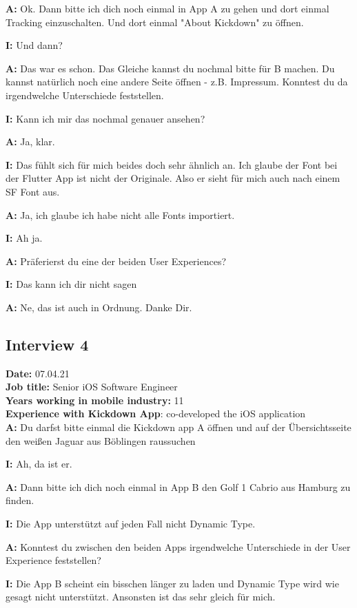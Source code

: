 \begin{myparindent}{0pt}
\textbf{A:} Ok. Dann bitte ich dich noch einmal in App A zu gehen und dort einmal Tracking einzuschalten. Und dort einmal "About Kickdown" zu öffnen. 

\textbf{I:} Und dann?

\textbf{A:} Das war es schon. Das Gleiche kannst du nochmal bitte für B machen. Du kannst natürlich noch eine andere Seite öffnen - z.B. Impressum.
Konntest du da irgendwelche Unterschiede feststellen.

\textbf{I:} Kann ich mir das nochmal genauer ansehen?

\textbf{A:} Ja, klar.

\textbf{I:} Das fühlt sich für mich beides doch sehr ähnlich an. Ich glaube der Font bei der Flutter App ist nicht der Originale. Also er sieht für mich auch nach einem SF Font aus.

\textbf{A:} Ja, ich glaube ich habe nicht alle Fonts importiert.

\textbf{I:} Ah ja. 

\textbf{A:} Präferierst du eine der beiden User Experiences?

\textbf{I:} Das kann ich dir nicht sagen

\textbf{A:} Ne, das ist auch in Ordnung. Danke Dir.

\subsection{Interview 4}
\textbf{Date:} 07.04.21\\
\textbf{Job title:} Senior iOS Software Engineer\\
\textbf{Years working in mobile industry:} 11\\
\textbf{Experience with Kickdown App}: co-developed the iOS application\\


\textbf{A:} Du darfst bitte einmal die Kickdown app A öffnen und auf der Übersichtsseite den weißen Jaguar aus Böblingen raussuchen

\textbf{I:} Ah, da ist er.

\textbf{A:} Dann bitte ich dich noch einmal in App B den Golf 1 Cabrio aus Hamburg zu finden. 

\textbf{I:} Die App unterstützt auf jeden Fall nicht Dynamic Type. 

\textbf{A:} Konntest du zwischen den beiden Apps irgendwelche Unterschiede in der User Experience feststellen?

\textbf{I:} Die App B scheint ein bisschen länger zu laden und Dynamic Type wird wie gesagt nicht unterstützt. Ansonsten ist das sehr gleich für mich. 


\end{myparindent}

